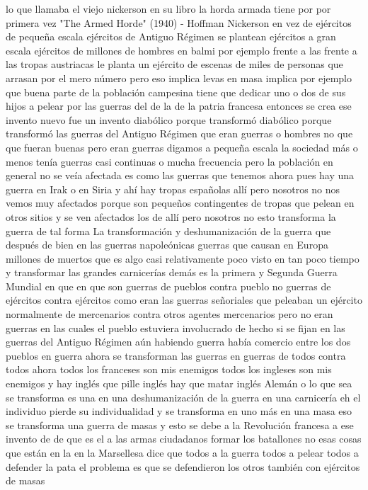lo que llamaba el viejo nickerson en su libro la horda armada tiene por por primera vez
"The Armed Horde" (1940) - Hoffman Nickerson
en vez de ejércitos de pequeña escala ejércitos de Antiguo Régimen se plantean ejércitos a gran escala
ejércitos de millones de hombres en balmi por ejemplo frente a las frente a las tropas austriacas
le planta un ejército de escenas de miles de personas que arrasan por el mero número pero eso implica levas en masa
implica por ejemplo que buena parte de la población campesina tiene que dedicar uno o dos de sus hijos a pelear por las guerras del
de la de la patria francesa entonces se crea ese invento nuevo fue un invento diabólico porque transformó diabólico
porque transformó las guerras del Antiguo Régimen que eran guerras o hombres no que que fueran buenas pero eran guerras digamos a pequeña escala
la sociedad más o menos tenía guerras casi continuas o mucha frecuencia pero la población en general no se veía afectada
es como las guerras que tenemos ahora pues hay una guerra en Irak o en Siria y ahí hay tropas españolas allí
pero nosotros no nos vemos muy afectados porque son pequeños contingentes de tropas que pelean en otros sitios
y se ven afectados los de allí pero nosotros no esto transforma la guerra de tal forma
La transformación y deshumanización de la guerra
que después de bien en las guerras napoleónicas guerras que causan en Europa millones de muertos que es algo casi
relativamente poco visto en tan poco tiempo y transformar las grandes carnicerías demás es la primera y Segunda Guerra Mundial
en que en que son guerras de pueblos contra pueblo no guerras de ejércitos contra ejércitos como eran las guerras señoriales
que peleaban un ejército normalmente de mercenarios contra otros agentes mercenarios pero no eran guerras en las cuales el pueblo estuviera involucrado
de hecho si se fijan en las guerras del Antiguo Régimen aún habiendo guerra había comercio entre los dos pueblos en guerra ahora se transforman las guerras
en guerras de todos contra todos ahora todos los franceses son mis enemigos todos los ingleses son mis enemigos
y hay inglés que pille inglés hay que matar inglés Alemán o lo que sea se transforma es una en una deshumanización de la guerra
en una carnicería eh el individuo pierde su individualidad y se transforma en uno más en una masa eso se transforma una guerra de masas
y esto se debe a la Revolución francesa a ese invento de de que es el a las armas ciudadanos
formar los batallones no esas cosas que están en la en la Marsellesa dice que todos a la guerra
todos a pelear todos a defender la pata el problema es que se defendieron los otros también con ejércitos de masas
